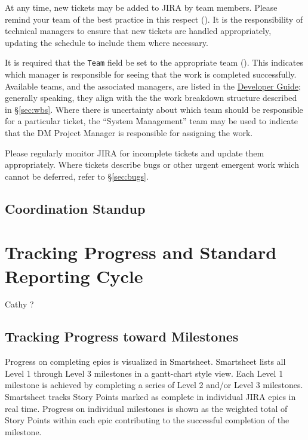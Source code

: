 At any time, new tickets may be added to \gls{JIRA} by team members.
Please remind your team of the best practice in this respect ().
It is the responsibility of technical managers to ensure that new tickets are handled appropriately, updating the schedule to include them where necessary.

It is required that the \texttt{Team} field be set to the appropriate team ().
This indicates which manager is responsible for \gls{seeing} that the work is completed successfully.
Available teams, and the associated managers, are listed in the \href{https://developer.lsst.io/processes/jira_agile.html}{Developer Guide}; generally speaking, they align with the the work breakdown structure described in \S\ref{sec:wbs}.
Where there is uncertainty about which team should be responsible for a particular ticket, the “System Management” team may be used to indicate that the \gls{DM} \gls{Project Manager} is responsible for assigning the work.

Please regularly monitor \gls{JIRA} for incomplete tickets and update them appropriately.
Where tickets describe bugs or other urgent emergent work which cannot be deferred, refer to \S\ref{sec:bugs}.

\subsection{Coordination Standup}
\label{sec:sup}

\section{Tracking Progress and Standard Reporting Cycle}
\label{sec:reporting-cycle}
 Cathy ?
 
\subsection{Tracking Progress toward Milestones}

Progress on completing epics is visualized in Smartsheet.  
Smartsheet lists all Level 1 through Level 3 milestones in a gantt-chart style view.  
Each Level 1 milestone is achieved by completing a series of Level 2 and/or Level 3 milestones.  
Smartsheet tracks Story Points marked as complete in individual \gls{JIRA} epics in real time. 
Progress on individual milestones is shown as the weighted total of Story Points within each epic contributing to the successful completion of the milestone. 
 

